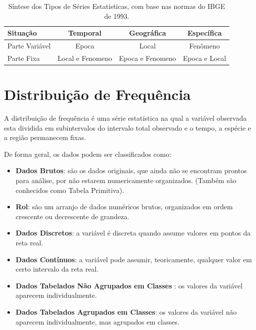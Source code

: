 

\begin{table}[H]
    \centering
    {
    \caption{Síntese dos Tipos de Séries Estatisticas, com base nas normas
do IBGE de 1993.}
    \label{sintese serie}
    \vspace{0.1cm}
\begin{tabular}{l||c||c||c}
  \hline\hline
  Situação       & Temporal          & Geográfica       & Específica     \\
  \hline\hline
  Parte Variável &  Epoca            & Local            & Fenômeno      \\
  Parte Fixa     &  Local e Fenomeno & Epoca e Fenomeno & Epoca e Local \\
  \hline\hline
\end{tabular}}
\end{table}




\section{Distribuição de Frequência}

A distribuição de frequência é uma série estatística na qual a variável observada esta dividida em subintervalos do intervalo total observado e o tempo, a espécie e a região permanecem fixas.\vskip0.3cm

De forma geral, os dados podem ser classificados como:


\begin{itemize}
  \item \textbf{Dados Brutos}: são os dados originais, que ainda não se encontram prontos para análise, por não estarem numericamente organizados. (Também são conhecidos como Tabela Primitiva).
  \item \textbf{Rol}: são um arranjo de dados numéricos brutos, organizados em ordem crescente ou decrescente de grandeza.
  \item \textbf{Dados Discretos}: a variável é discreta quando assume valores em pontos da reta real.
  \item \textbf{Dados Contínuos}: a variável pode assumir, teoricamente, qualquer valor em certo intervalo da reta real.
  \item \textbf{Dados Tabelados Não Agrupados em Classes} : os valores da variável aparecem individualmente.
  \item \textbf{Dados Tabelados Agrupados em Classes}: os valores da variável não aparecem individualmente, mas agrupados em classes.
\end{itemize}

